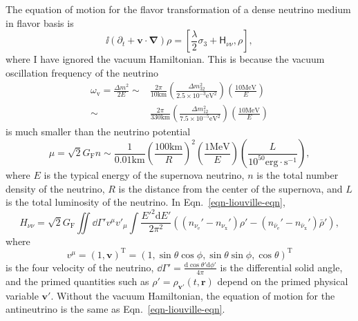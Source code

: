 The equation of motion for the flavor transformation of a dense neutrino medium in flavor basis is
\begin{equation}
\ii (\partial_t + \mathbf v\cdot \mathbf{\nabla}) \rho = \left[ \frac{\lambda}{2} \sigma_3 + \mathsf H_{\nu\nu}, \rho \right],
\label{eqn-liouville-eqn}
\end{equation}
where I have ignored the vacuum Hamiltonian. This is because the vacuum oscillation frequency of the neutrino
\begin{align*}
 \omega_{\mathrm v} = \frac{\Delta m^2}{2E}  \sim& \frac{2\pi}{ 10  \mathrm{km} }  \left(\frac{\Delta m^2_{32}}{2.5\times 10^{-3} \mathrm{eV}^2 } \right) \left( \frac{10 \mathrm{MeV}}{E} \right) \\
\sim & \frac{2\pi}{ 330  \mathrm{km} } \left( \frac{\Delta m_{12}^2}{7.5\times 10^{-5}\mathrm{eV}^2} \right) \left( \frac{10 \mathrm{MeV}}{E} \right)
\end{align*}
is much smaller than the neutrino potential
\begin{equation*}
\mu = \sqrt{2}G_{\mathrm F} n \sim  \frac{1}{0.01 \mathrm{km}} \left(\frac{100\mathrm{km}}{R}\right)^2 \left(\frac{1\mathrm{MeV}}{E}\right) \left( \frac{ L }{ 10^{50}\mathrm{erg\cdot s^{-1}} } \right),
\end{equation*}
where $E$ is the typical energy of the supernova neutrino, $n$ is the total number density of the neutrino, $R$ is the distance from the center of the supernova, and $L$ is the total luminosity of the neutrino.
In Eqn.~\ref{eqn-liouville-eqn},
\begin{equation}
H_{\nu\nu} = \sqrt{2} G_{\mathrm F} \iint \dd \Gamma' v^\mu v'_\mu \int \frac{E'^2 \mathrm d E'}{2\pi^2} \left( (n_{\nu_{\mathrm e}}' - n_{\nu_{\mathrm x}}' )\rho' -  (n_{\bar\nu_{\mathrm e}}' - n_{\bar\nu_{\mathrm x}}' ) \bar\rho' \right),
\end{equation}
where
\begin{equation}
    v^\mu = (1, \mathbf v)^{\mathrm T} = ( 1, \sin\theta\cos\phi, \sin\theta\sin\phi, \cos\theta )^{\mathrm T}
\end{equation}
is the four velocity of the neutrino, $\dd \Gamma' = \frac{\mathrm d \cos\theta' \mathrm d\phi'}{4\pi}$ is the differential solid angle, and the primed quantities such as $\rho'=\rho_{\mathbf v'} (t, \mathbf r)$ depend on the primed physical variable $\mathbf v'$. Without the vacuum Hamiltonian, the equation of motion for the antineutrino is the same as Eqn.~\ref{eqn-liouville-eqn}.


